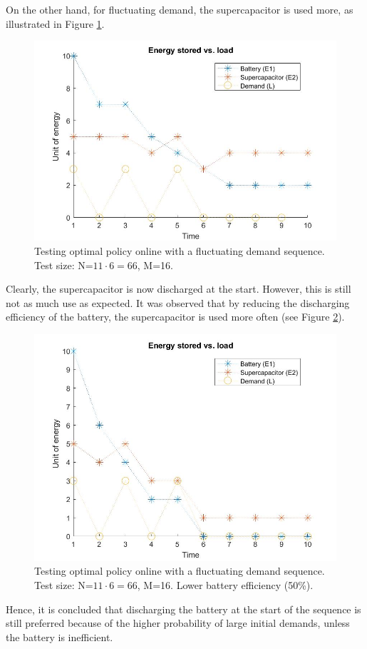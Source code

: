 \documentclass[conference]{IEEEtran}
\begin{document}
On the other hand, for fluctuating demand, the supercapacitor is used more, as illustrated in Figure \ref{fig:FluctuatingDemand}.
\begin{figure}[htbp]
\centerline{\includegraphics[scale=0.25]{EnergyStoredvsFluctuatingLoad(E1=10,E2=5).jpg}}
\caption{Testing optimal policy online with a fluctuating demand sequence. Test size: N=$11\cdot6=66$, M=16.}
\label{fig:FluctuatingDemand}
\end{figure} Clearly, the supercapacitor is now discharged at the start. However, this is still not as much use as expected. It was observed that by reducing the discharging efficiency of the battery, the supercapacitor is used more often (see Figure \ref{fig:FluctuatingDemand_LowBattEff}).
\begin{figure}[htbp]
\centerline{\includegraphics[scale=0.25]{EnergyStoredvsFluctuatingLoad_LowBattEff(E1=10,E2=5).jpg}}
\caption{Testing optimal policy online with a fluctuating demand sequence. Test size: N=$11\cdot6=66$, M=16. Lower battery efficiency (50\%).}
\label{fig:FluctuatingDemand_LowBattEff}
\end{figure} Hence, it is concluded that discharging the battery at the start of the sequence is still preferred because of the higher probability of large initial demands, unless the battery is inefficient.
\end{document}
